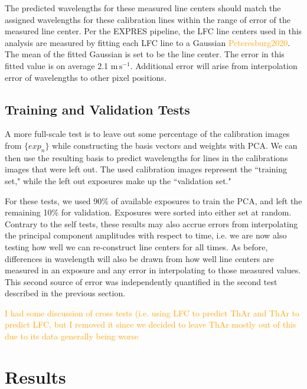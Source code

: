 \documentclass[twocolumn]{aastex63}
\newcommand{\lz}[1]{\textcolor{orange}{#1}}
\newcommand{\mps}{\mathrm{m\,s^{-1}}}
\begin{document}
The predicted wavelengths for these measured line centers should match the assigned wavelengths for these calibration lines within the range of error of the measured line center.  Per the EXPRES pipeline, the LFC line centers used in this analysis are measured by fitting each LFC line to a Gaussian \lz{Peteresburg2020}.  The mean of the fitted Gaussian is set to be the line center.  The error in this fitted value is on average 2.1 $\mps$.  Additional error will arise from interpolation error of wavelengths to other pixel positions.  

\subsection{Training and Validation Tests} \label{sec:test-trainNvalid}
A more full-scale test is to leave out some percentage of the calibration images from $\{exp_n\}$ while constructing the basis vectors and weights with PCA.  We can then use the resulting basis to predict wavelengths for lines in the calibrations images that were left out.  The used calibration images represent the ``training set," while the left out exposures make up the ``validation set."

For these tests, we used 90\% of available exposures to train the PCA, and left the remaining 10\% for validation.  Exposures were sorted into either set at random.  Contrary to the self tests, these results may also accrue errors from interpolating the principal component amplitudes with respect to time, i.e. we are now also testing how well we can re-construct line centers for all times.   As before, differences in wavelength will also be drawn from how well line centers are measured in an exposure and any error in interpolating to those measured values.  This second source of error was independently quantified in the second test described in the previous section.

\lz{I had some discussion of cross tests (i.e. using LFC to predict ThAr and ThAr to predict LFC, but I removed it since we decided to leave ThAr mostly out of this due to its data generally being worse}

\section{Results} \label{sec:results}
\end{document}
